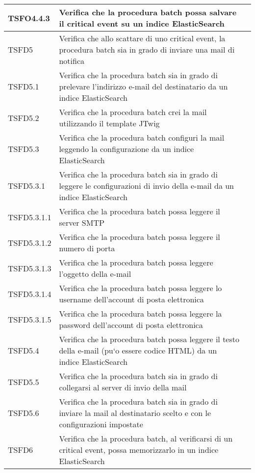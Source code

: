 \begin{center}
\begin{longtable}{ | >{\centering\arraybackslash}m{2.5cm} | >{\raggedright\arraybackslash}m{9cm} | >{\centering\arraybackslash}m{3.5cm} | }
				TSFO4.4.3 & Verifica che la procedura batch possa salvare il critical event su un indice ElasticSearch & \donetext{} \\ \hline
				TSFD5 & Verifica che allo scattare di uno critical event, la procedura batch sia in grado di inviare una mail di notifica & \donetext{} \\ \hline
				TSFD5.1 & Verifica che la procedura batch sia in grado di prelevare l'indirizzo e-mail del destinatario
				da un indice ElasticSearch & \donetext{} \\ \hline
				TSFD5.2 & Verifica che la procedura batch crei la mail utilizzando il template JTwig & \donetext{} \\ \hline
				TSFD5.3 & Verifica che la procedura batch configuri la mail leggendo la configurazione da un indice ElasticSearch & \donetext{} \\ \hline
				TSFD5.3.1 & Verifica che la procedura batch sia in grado di leggere le conﬁgurazioni di invio della e-mail da un indice ElasticSearch
 & \donetext{} \\ \hline
				TSFD5.3.1.1 & Verifica che la procedura batch possa leggere il server SMTP
 & \donetext{} \\ \hline
				TSFD5.3.1.2 & Verifica che la procedura batch possa leggere il numero di porta
 & \donetext{} \\ \hline
				TSFD5.3.1.3 & Verifica che la procedura batch possa leggere l'oggetto della e-mail
 & \donetext{} \\ \hline
				TSFD5.3.1.4 & Verifica che la procedura batch possa leggere lo username dell'account di posta elettronica & \donetext{} \\ \hline
				TSFD5.3.1.5 & Verifica che la procedura batch possa leggere la password dell'account di posta elettronica & \donetext{} \\ \hline
				TSFD5.4 & Verifica che la procedura batch possa leggere il testo della e-mail (pu`o essere codice HTML) da un indice ElasticSearch
 & \donetext{} \\ \hline
				TSFD5.5 & Verifica che la procedura batch sia in grado di collegarsi al server di invio della mail & \donetext{} \\ \hline
				TSFD5.6 & Verifica che la procedura batch sia in grado di inviare la mail al destinatario scelto e con le configurazioni
							impostate & \donetext{} \\ \hline
				TSFD6 & Verifica che la procedura batch, al verificarsi di un critical event, possa memorizzarlo in un indice ElasticSearch & \donetext{} \\ \hline

\end{longtable}
\end{center}
